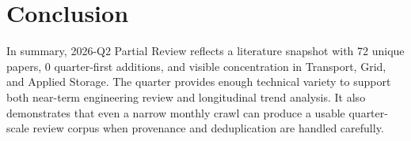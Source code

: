 \documentclass[conference]{IEEEtran}
\begin{document}
\section{Conclusion}
In summary, 2026-Q2 Partial Review reflects a literature snapshot with 72 unique papers, 0 quarter-first additions, and visible concentration in Transport, Grid, and Applied Storage. The quarter provides enough technical variety to support both near-term engineering review and longitudinal trend analysis. It also demonstrates that even a narrow monthly crawl can produce a usable quarter-scale review corpus when provenance and deduplication are handled carefully.



\end{document}
